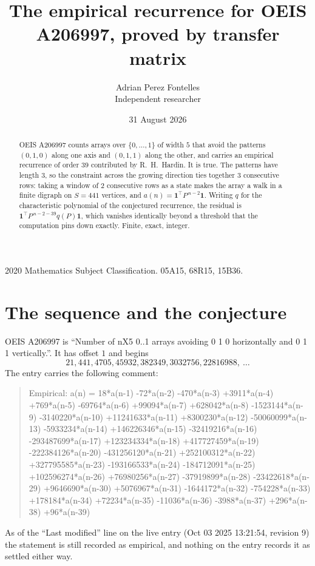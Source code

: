 \documentclass[11pt,a4paper]{article}
\title{The empirical recurrence for OEIS A206997, proved by transfer matrix}
\author{Adrian Perez Fontelles\\ \small Independent researcher}
\date{31 August 2026}
\theoremstyle{plain}
\theoremstyle{definition}
\begin{document}
\maketitle

\begin{abstract}
OEIS A206997 counts arrays over $\{0,\dots,1\}$ of width $5$ that avoid the patterns
$(0,1,0)$ along one axis and $(0,1,1)$ along the other, and carries an empirical recurrence of
order $39$ contributed by R.~H.~Hardin. It is true. The patterns have length $3$, so
the constraint across the growing direction ties together $3$ consecutive rows: taking a
window of $2$ consecutive rows as a state makes the array a walk in a finite digraph
on $S=441$ vertices, and $a(n)=\mathbf{1}^{\!\top}P^{\,n-2}\mathbf{1}$. Writing $q$
for the characteristic polynomial of the conjectured recurrence, the residual is
$\mathbf{1}^{\!\top}P^{\,n-2-39}q(P)\mathbf{1}$, which vanishes identically
beyond a threshold that the computation pins down exactly. Finite, exact, integer.
\end{abstract}

\noindent\small 2020 Mathematics Subject Classification. 05A15, 68R15, 15B36.\normalsize

\section{The sequence and the conjecture}

OEIS A206997 is ``Number of nX5 0..1 arrays avoiding 0 1 0 horizontally and 0 1 1 vertically.''. It has offset
$1$ and begins
\[
21, 441, 4705, 45932, 382349, 3032756, 22816988,\ \dots
\]
The entry carries the following comment:
\begin{quote}\small
Empirical: a(n) = 18*a(n-1) -72*a(n-2) -470*a(n-3) +3911*a(n-4) +769*a(n-5) -69764*a(n-6) +99094*a(n-7) +628042*a(n-8) -1523144*a(n-9) -3140220*a(n-10) +11241633*a(n-11) +8300230*a(n-12) -50060099*a(n-13) -5933234*a(n-14) +146226346*a(n-15) -32419216*a(n-16) -293487699*a(n-17) +123234334*a(n-18) +417727459*a(n-19) -222384126*a(n-20) -431256120*a(n-21) +252100312*a(n-22) +327795585*a(n-23) -193166533*a(n-24) -184712091*a(n-25) +102596274*a(n-26) +76980256*a(n-27) -37919899*a(n-28) -23422618*a(n-29) +9646690*a(n-30) +5076967*a(n-31) -1644172*a(n-32) -754228*a(n-33) +178184*a(n-34) +72234*a(n-35) -11036*a(n-36) -3988*a(n-37) +296*a(n-38) +96*a(n-39)
\end{quote}
As of the ``Last modified'' line on the live entry (Oct 03 2025 13:21:54, revision
9) the statement is still recorded as empirical, and nothing on the entry
records it as settled either way.
\end{document}
